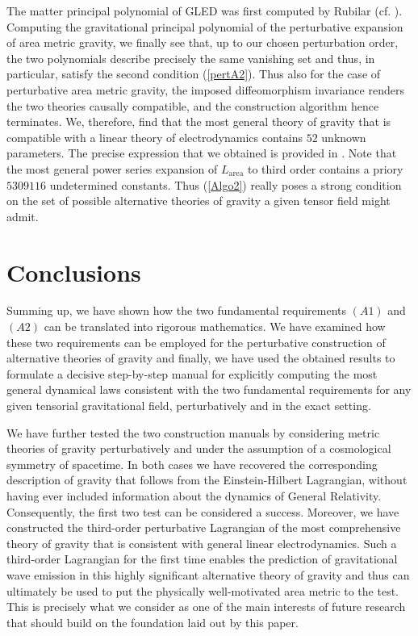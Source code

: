 \documentclass[%
preprint,
titlepage,
nofootinbib,
amsmath,amssymb,
showkeys,
aps,
prd,
floatfix,
]{revtex4-2}
\begin{document}
The matter principal polynomial of GLED was first computed by Rubilar (cf. \cite{2009JPhA...42U5402I}).
Computing the gravitational principal polynomial of the perturbative expansion of area metric gravity, we finally see that, up to our chosen perturbation order, the two polynomials describe precisely the same vanishing set and thus, in particular, satisfy the second condition (\ref{pertA2}). 
Thus also for the case of perturbative area metric gravity, the imposed diffeomorphism invariance renders the two theories causally compatible, and the construction algorithm hence terminates. 
We, therefore, find that the most general theory of gravity that is compatible with a linear theory of electrodynamics contains $52$ unknown parameters. The precise expression that we obtained is provided in \cite{TobiMaster}.
Note that the most general power series expansion of $L_{\text{area}}$ to third order contains a priory $5309116$ undetermined constants. Thus (\ref{Algo2}) really poses a strong condition on the set of possible alternative theories of gravity a given tensor field might admit. 
\section{Conclusions}
Summing up, we have shown how the two fundamental requirements $(A1)$ and $(A2)$ can be translated into rigorous mathematics. We have examined how these two requirements can be employed for the perturbative construction of alternative theories of gravity and finally, we have used the obtained results to formulate a decisive step-by-step manual for explicitly computing the most general dynamical laws consistent with the two fundamental requirements for any given tensorial gravitational field, perturbatively and in the exact setting.  

We have further tested the two construction manuals by considering metric theories of gravity perturbatively and under the assumption of a cosmological symmetry of spacetime. In both cases we have recovered the corresponding description of gravity that follows from the Einstein-Hilbert Lagrangian, without having ever included information about the dynamics of General Relativity. Consequently, the first two test can be considered a success.
Moreover, we have constructed the third-order perturbative Lagrangian of the most comprehensive theory of gravity that is consistent with general linear electrodynamics. Such a third-order Lagrangian for the first time enables the prediction of gravitational wave emission in this highly significant alternative theory of gravity and thus can ultimately be used to put the physically well-motivated area metric to the test. This is precisely what we consider as one of the main interests of future research that should build on the foundation laid out by this paper.  



\end{document}
